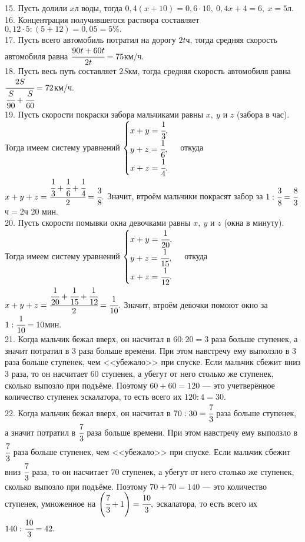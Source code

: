 15. Пусть долили $x$л воды, тогда $0,4(x+10)=0,6\cdot10,\ 0,4x+4=6,\ x=5$л.\\
16. Концентрация получившегося раствора составляет $0,12\cdot5:(5+12)=0,05=5\%.$\\
17. Пусть всего автомобиль потратил на дорогу $2t$ч, тогда средняя скорость автомобиля равна $\cfrac{90t+60t}{2t}=75$км/ч.\\
18. Пусть весь путь составляет $2S$км, тогда средняя скорость автомобиля равна $\cfrac{2S}{\cfrac{S}{90}+\cfrac{S}{60}}=72$км/ч.\\
19. Пусть скорости покраски забора мальчиками равны $x,\ y$ и $z$ (забора в час). Тогда имеем систему уравнений $\begin{cases} x+y=\cfrac{1}{3},\\ y+z=\cfrac{1}{6},\\ x+z=\cfrac{1}{4}.\end{cases}$ откуда $x+y+z=\cfrac{\cfrac{1}{3}+\cfrac{1}{6}+\cfrac{1}{4}}{2}=\cfrac{3}{8}.$ Значит, втроём мальчики покрасят забор за $1:\cfrac{3}{8}=\cfrac{8}{3}$ч$=2$ч 20 мин.\\
20. Пусть скорости помывки окна девочками равны $x,\ y$ и $z$ (окна в минуту). Тогда имеем систему уравнений $\begin{cases} x+y=\cfrac{1}{20},\\ y+z=\cfrac{1}{15},\\ x+z=\cfrac{1}{12}.\end{cases}$ откуда $x+y+z=\cfrac{\cfrac{1}{20}+\cfrac{1}{15}+\cfrac{1}{12}}{2}=\cfrac{1}{10}.$ Значит, втроём девочки помоют окно за $1:\cfrac{1}{10}=10$мин.\\
21. Когда мальчик бежал вверх, он насчитал в $60:20=3$ раза больше ступенек, а значит потратил в 3 раза больше времени. При этом навстречу ему выползло в 3 раза больше ступенек, чем <<убежало>> при спуске. Если мальчик сбежит вниз 3 раза, то он насчитает 60 ступенек, а убегут от него столько же ступенек, сколько выпозло при подъёме. Поэтому $60+60=120$ --- это учетверённое количество ступенек эскалатора, то есть всего их $120:4=30.$\\
22. Когда мальчик бежал вверх, он насчитал в $70:30=\cfrac{7}{3}$ раза больше ступенек, а значит потратил в $\cfrac{7}{3}$ раза больше времени. При этом навстречу ему выползло в $\cfrac{7}{3}$ раза больше ступенек, чем <<убежало>> при спуске. Если мальчик сбежит вниз $\cfrac{7}{3}$ раза, то он насчитает 70 ступенек, а убегут от него столько же ступенек, сколько выпозло при подъёме. Поэтому $70+70=140$ --- это количество ступенек, умноженное на $\left(\cfrac{7}{3}+1\right)=\cfrac{10}{3},$ эскалатора, то есть всего их $140:\cfrac{10}{3}=42.$\\
